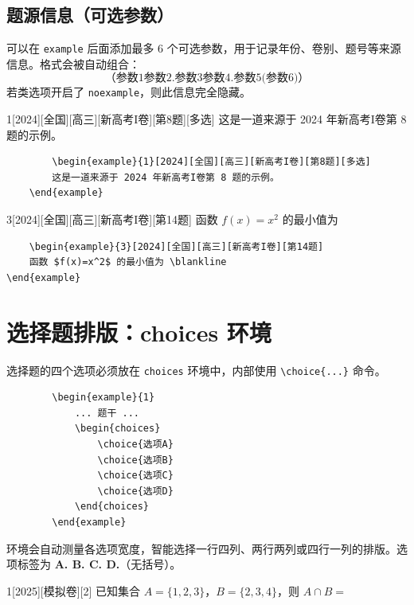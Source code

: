 \documentclass[
showanswers,        %
answercolor=red,    %
numbercolor=blue,   %
paper=a3,           %
nojuemi,              %
nozhuyishixiang,      %
example,        %
]{biscuits}
\begin{document}
	\subsection{题源信息（可选参数）}
	
	可以在 \texttt{example} 后面添加最多 6 个可选参数，用于记录年份、卷别、题号等来源信息。格式会被自动组合：
	\[
	\text{（参数1参数2.参数3参数4.参数5(参数6)）}
	\]
	若类选项开启了 \texttt{noexample}，则此信息完全隐藏。
	
	\begin{example}{1}[2024][全国][高三][新高考I卷][第8题][多选]
		这是一道来源于 2024 年新高考I卷第 8 题的示例。
	\end{example}
\begin{verbatim}
		\begin{example}{1}[2024][全国][高三][新高考I卷][第8题][多选]
		这是一道来源于 2024 年新高考I卷第 8 题的示例。 
	\end{example}
\end{verbatim}
	\begin{example}{3}[2024][全国][高三][新高考I卷][第14题]
		函数 $f(x)=x^2$ 的最小值为 \blankline
	\end{example}
\begin{verbatim}
	\begin{example}{3}[2024][全国][高三][新高考I卷][第14题]
	函数 $f(x)=x^2$ 的最小值为 \blankline
\end{example}
\end{verbatim}	
	\section{选择题排版：choices 环境}
	
	选择题的四个选项必须放在 \texttt{choices} 环境中，内部使用 \verb|\choice{...}| 命令。
	
	\begin{verbatim}
		\begin{example}{1}
			... 题干 ...
			\begin{choices}
				\choice{选项A}
				\choice{选项B}
				\choice{选项C}
				\choice{选项D}
			\end{choices}
		\end{example}
	\end{verbatim}
	
	环境会自动测量各选项宽度，智能选择一行四列、两行两列或四行一列的排版。选项标签为 \textbf{A. B. C. D.}（无括号）。
	
	\begin{example}{1}[2025][模拟卷][2]
		已知集合 $A=\{1,2,3\}$，$B=\{2,3,4\}$，则 $A\cap B=$
		\begin{choices}
		\end{choices}
	\end{example}
	
\end{document}
